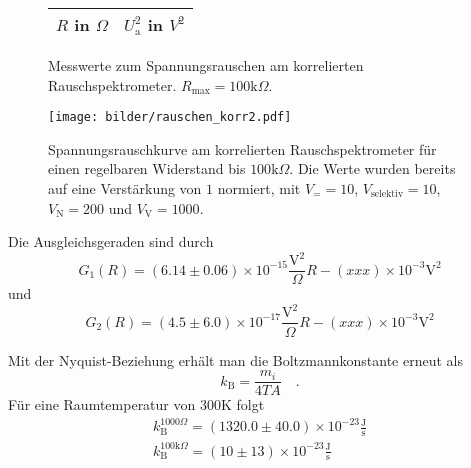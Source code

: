 	
	
	
		\begin{figure}[htbp]

	\begin{minipage}{0.3\textwidth} 

			\centering
			\begin{tabular}{cc}
				\toprule \midrule
				$R$ in $\Omega$ & $U_\text{a}^2$ in $V^2$ \\
				\midrule
							
				\midrule \bottomrule
			\end{tabular}
			\caption{Messwerte zum Spannungsrauschen am korrelierten  
			Rauschspektrometer. $R_\text{max}=100 \text{k}\Omega$.}
			\label{tab:rauschen_korr2}

	\end{minipage}
	\hfill
	\begin{minipage}{0.7\textwidth}

			\centering
			\texttt{[image: bilder/rauschen\_korr2.pdf]}
			\caption{Spannungsrauschkurve am korrelierten Rauschspektrometer für einen 
			regelbaren Widerstand bis $100\text{k}\Omega$. Die Werte wurden bereits auf eine 
			Verstärkung von 	$1$ normiert, mit $V_= =10$, $V_\text{selektiv}=10$, $V_\text{N}=200$ und 
			$V_\text{V}=1000$. }
			\label{fig:rauschen_korr2}
			
	\end{minipage}

	\end{figure}		
		

		Die Ausgleichsgeraden sind durch
		\begin{equation}
			G_1(R) = (6.14 \pm 0.06) \times 10^{-15} \frac{\text{V}^2}{\Omega} R 
					- (xxx)\times 10^{-3}\text{V}^2 		
		\end{equation}
		und
		\begin{equation}
			G_2(R) = (4.5 \pm 6.0) \times 10^{-17} \frac{\text{V}^2}{\Omega} R 
					- (xxx)\times 10^{-3}\text{V}^2 		
		\end{equation}
		
		Mit der Nyquist-Beziehung erhält man die Boltzmannkonstante erneut als
		\begin{equation}
		k_\text{B}=\frac{m_i}{4 T A} \quad .
		\end{equation}
 		Für eine Raumtemperatur von $300$K folgt
		\begin{align}
		k_\text{B}^{1000\Omega}			=  (1320.0\pm 40.0)\times 10^{-23} \frac{\text{J}}{\text{s}} 
		\\
		k_\text{B}^{100\text{k}\Omega}	=	(10\pm 13)\times 10^{-23} \frac{\text{J}}{\text{s}}  
		\end{align}
	
